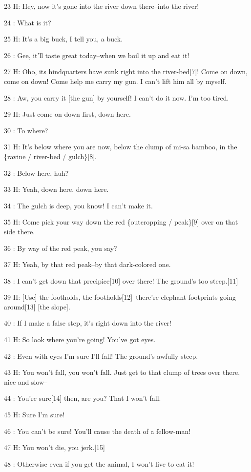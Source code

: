 23 H: Hey, now it's gone into the river down there--into the river!

24  : What is it?

25 H: It's a big buck, I tell you, a buck.

26  : Gee, it'll taste great today--when we boil it up and eat it!

27 H: Oho, its hindquarters have sunk right into the river-bed[7]! Come on down,
come on down! Come help me carry my gun. I can't lift him all by myself.

28  : Aw, you carry it [the gun] by yourself! I can't do it now. I'm too tired.

29 H: Just come on down first, down here.

30  : To where?

31 H: It's below where you are now, below the clump of mi-sa bamboo, in the \{ravine
/ river-bed / gulch\}[8].

32  : Below here, huh?

33 H: Yeah, down here, down here.

34  : The gulch is deep, you know! I can't make it.

35 H: Come pick your way down the red \{outcropping / peak\}[9] over on that side
there.

36  : By way of the red peak, you say?

37 H: Yeah, by that red peak--by that dark-colored one.

38  : I can't get down that precipice[10] over there! The ground's too steep.[11]

39 H: [Use] the footholds, the footholds[12]--there're elephant footprints going
around[13] [the slope].

40  : If I make a false step, it's right down into the river!

41 H: So look where you're going! You've got eyes.

42  : Even with eyes I'm sure I'll fall! The ground's awfully steep.

43 H: You won't fall, you won't fall. Just get to that clump of trees over there,
nice and slow--

44  : You're sure[14] then, are you? That I won't fall.

45 H: Sure I'm sure!

46  : You can't be sure! You'll cause the death of a fellow-man!

47 H: You won't die, you jerk.[15]

48  : Otherwise even if you get the animal, I won't live to eat it!

